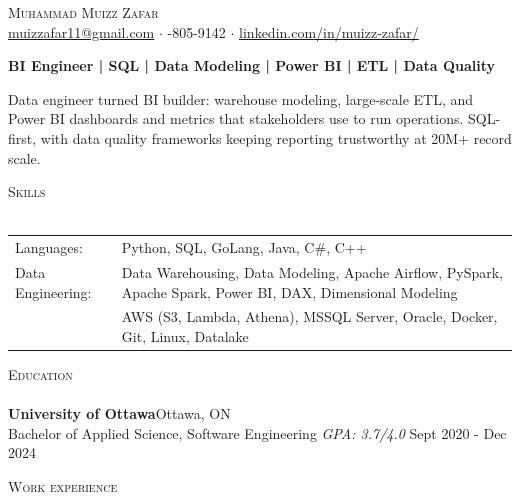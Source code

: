 \documentclass[a4paper]{article}
\newcommand{\lineunder} {
    \vspace*{-8pt} \\
    \hspace*{-18pt} \hrulefill \\
}
\newcommand{\header} [1] {
    {\hspace*{-18pt}\vspace*{6pt} \textsc{#1}}
    \vspace*{-6pt} \lineunder
}
\begin{document}
\vspace*{-40pt}

\vspace*{-10pt}
\begin{center}
	{\Huge \scshape {Muhammad Muizz Zafar}}\\
	\faSend \space \href{mailto:muizzafar11@gmail.com}{muizzafar11@gmail.com} $\cdot$ \faPhoneSquare {}-805-9142 $\cdot$ \faLinkedinSquare \space \href{https://www.linkedin.com/in/muizz-zafar/}{linkedin.com/in/muizz-zafar/}
	\\
\end{center}

\vspace{-5pt}
\begin{center}
\textbf{BI Engineer | SQL | Data Modeling | Power BI | ETL | Data Quality}
\end{center}
\begin{center}
Data engineer turned BI builder: warehouse modeling, large-scale ETL, and Power BI dashboards and metrics that stakeholders use to run operations. SQL-first, with data quality frameworks keeping reporting trustworthy at 20M+ record scale.
\end{center}

\header{Skills}
\begin{tabular}{ l l }
	Languages: 
& Python, SQL, GoLang, Java, C\#, C++ \\

Data Engineering: 
& Data Warehousing, Data Modeling, Apache Airflow, PySpark, Apache Spark, Power BI, DAX, Dimensional Modeling\\
& AWS (S3, Lambda, Athena), MSSQL Server, Oracle, Docker, Git, Linux, Datalake

\end{tabular}

\header{Education}
\textbf{University of Ottawa}\hfill Ottawa, ON\\
Bachelor of Applied Science, Software Engineering \textit{GPA: 3.7/4.0} \hfill Sept 2020 - Dec 2024\\
\vspace{2mm}

\header{Work experience}
\vspace{1.5mm}
\end{document}
